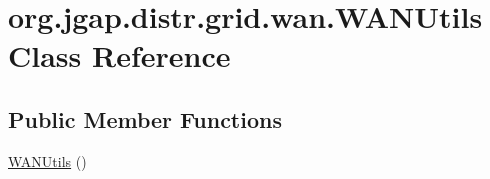 \hypertarget{classorg_1_1jgap_1_1distr_1_1grid_1_1wan_1_1_w_a_n_utils}{\section{org.\-jgap.\-distr.\-grid.\-wan.\-W\-A\-N\-Utils Class Reference}
\label{classorg_1_1jgap_1_1distr_1_1grid_1_1wan_1_1_w_a_n_utils}
}
\subsection*{Public Member Functions}
\begin{DoxyCompactItemize}
\item 
\hyperlink{classorg_1_1jgap_1_1distr_1_1grid_1_1wan_1_1_w_a_n_utils_a93257f7c8d6d101a4a54484f87221420}{W\-A\-N\-Utils} ()
\end{DoxyCompactItemize}
